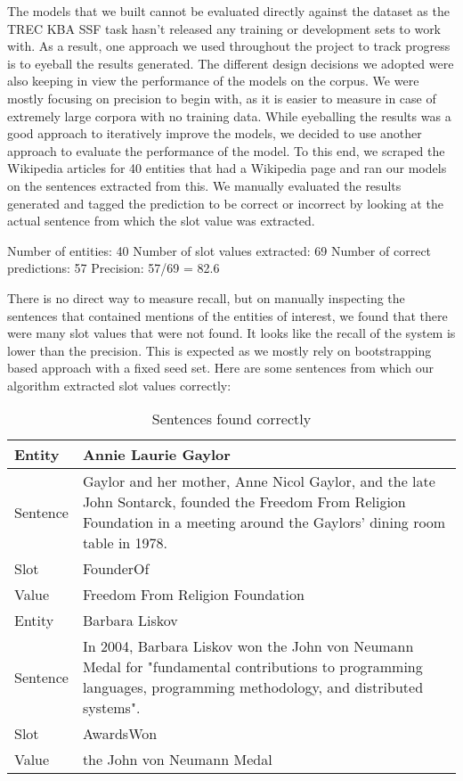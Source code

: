 The models that we built cannot be evaluated directly against the dataset as the TREC KBA SSF task hasn’t released any training or development sets to work with. As a result, one approach we used throughout the project to track progress is to eyeball the results generated. The different design decisions we adopted were also keeping in view the performance of the models on the corpus. We were mostly focusing on precision to begin with, as it is easier to measure in case of extremely large corpora with no training data. 
While eyeballing the results was a good approach to iteratively improve the models, we decided to use another approach to evaluate the performance of the model. To this end, we scraped the Wikipedia articles for 40 entities that had a Wikipedia page and ran our models on the sentences extracted from this. We manually evaluated the results generated and tagged the prediction to be correct or incorrect by looking at the actual sentence from which the slot value was extracted.

Number of entities: 40
Number of slot values extracted: 69
Number of correct predictions: 57
Precision: 57/69 = 82.6

There is no direct way to measure recall, but on manually inspecting the sentences that contained mentions of the entities of interest, we found that there were many slot values that were not found. It looks like the recall of the system is lower than the precision. This is expected as we mostly rely on bootstrapping based approach with a fixed seed set.
Here are some sentences from which our algorithm extracted slot values correctly:

\begin{table*}[ht]
\centering
\begin{tabular}{|p{3cm}|p{10cm}|}
\hline
Entity & Annie Laurie Gaylor \\
\hline
Sentence & Gaylor and her mother, Anne Nicol Gaylor, and the late John Sontarck, founded the Freedom From Religion Foundation in a meeting around the Gaylors' dining room table in 1978.\\
\hline
Slot & FounderOf\\
\hline
Value & Freedom From Religion Foundation\\
\hline
\hline
Entity & Barbara Liskov \\
\hline
Sentence & In 2004, Barbara Liskov won the John von Neumann Medal for "fundamental contributions to programming languages, programming methodology, and distributed systems". \\
\hline
Slot & AwardsWon \\
\hline
Value & the John von Neumann Medal \\
\hline
\end{tabular}
\caption{Sentences found correctly}
\label{tab:model_correct}
\end{table*}

